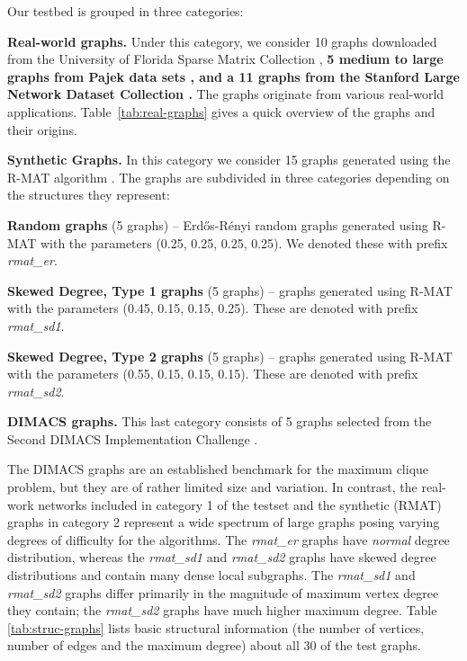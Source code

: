 Our testbed is grouped in three categories:\\
\begin{enumerate*}[label=\textbf{\arabic*})]
\item {\bf Real-world graphs. } 
Under this category, we consider 10 graphs downloaded from the 
University of Florida Sparse Matrix Collection  \cite{Davis97theuniversity}, {\bf 5 medium to large graphs from Pajek data sets \cite{pajek2006}, and a 11 graphs from the Stanford Large Network Dataset Collection \cite{stanford_dataset}.}
The graphs originate
from various real-world applications. 
Table~\ref{tab:real-graphs} gives a quick overview of the graphs and their origins.\\


\item {\bf Synthetic Graphs. } 
In this category we consider 15 graphs generated using 
the R-MAT algorithm \cite{Chakrabarti:2006:GML:1132952.1132954}. The graphs
are subdivided in three categories depending on the structures they represent:\\

\begin{enumerate*}[label=\textbf{\alph*})]
\item {\bf Random graphs} (5 graphs) -- Erd\H{o}s-R\'{e}nyi random  graphs generated using R-MAT with the parameters (0.25, 0.25, 0.25, 0.25).  We denoted these with prefix {\it rmat\_er}.\\
\item {\bf Skewed Degree, Type 1 graphs} (5 graphs) -- graphs generated using R-MAT with the parameters (0.45, 0.15, 0.15, 0.25). These are denoted with prefix {\it rmat\_sd1}.\\
\item {\bf Skewed Degree, Type 2 graphs} (5 graphs) --  graphs generated using R-MAT with the parameters (0.55, 0.15, 0.15, 0.15). These are denoted with prefix {\it rmat\_sd2}.\\
\end{enumerate*}

\item {\bf DIMACS graphs. } 
This last category consists of 5 graphs selected from the Second DIMACS Implementation Challenge \cite{dimacs}.
\end{enumerate*}

The DIMACS graphs  are an established benchmark for the maximum
clique problem, but they are of rather limited size and variation. 
In contrast, the real-work networks included  in category 1 of the testset
and the synthetic (RMAT) graphs in category 2
represent a wide spectrum of large graphs posing varying degrees of difficulty for the algorithms. 
The {\it rmat\_er} graphs have {\it normal} degree distribution, whereas the {\it rmat\_sd1} and {\it rmat\_sd2} graphs have skewed degree distributions and contain many dense local subgraphs.
 The {\it rmat\_sd1} and {\it rmat\_sd2} graphs differ primarily in the magnitude of maximum vertex degree they contain; the {\it rmat\_sd2} graphs have much higher maximum degree. 
Table \ref{tab:struc-graphs} lists basic structural information (the number of vertices, 
number of edges and the maximum degree) about all 30 of the test graphs.

